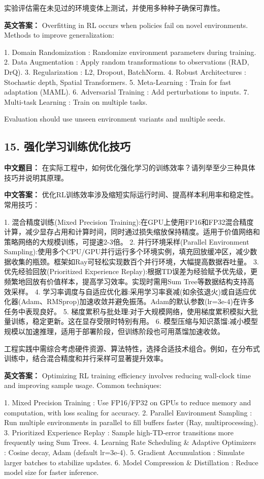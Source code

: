\documentclass[10pt,a4paper]{ctexart}
\begin{document}
实验评估需在未见过的环境变体上测试，并使用多种种子确保可靠性。

\textbf{英文答案：}  
Overfitting in RL occurs when policies fail on novel environments. Methods to improve generalization:

1.  Domain Randomization : Randomize environment parameters during training.
2.  Data Augmentation : Apply random transformations to observations (RAD, DrQ).
3.  Regularization : L2, Dropout, BatchNorm.
4.  Robust Architectures : Stochastic depth, Spatial Transformers.
5.  Meta-Learning : Train for fast adaptation (MAML).
6.  Adversarial Training : Add perturbations to inputs.
7.  Multi-task Learning : Train on multiple tasks.

Evaluation should use unseen environment variants and multiple seeds.

\subsection*{15. 强化学习训练优化技巧}
\textbf{中文题目：} 在实际工程中，如何优化强化学习的训练效率？请列举至少三种具体技巧并说明其原理。

\textbf{中文答案：}  
优化RL训练效率涉及缩短实际运行时间、提高样本利用率和稳定性。常用技巧：

1.  混合精度训练(Mixed Precision Training):在GPU上使用FP16和FP32混合精度计算，减少显存占用和计算时间，同时通过损失缩放保持精度。适用于价值网络和策略网络的大规模训练，可提速2-3倍。
2.  并行环境采样(Parallel Environment Sampling):使用多个CPU/GPU并行运行多个环境实例，填充回放缓冲区，减少数据收集的瓶颈。框架如Ray可轻松实现数百个并行环境，大幅提高数据吞吐量。
3.  优先经验回放(Prioritized Experience Replay):根据TD误差为经验赋予优先级，更频繁地回放有价值样本，提高学习效率。实现时需用Sum Tree等数据结构支持高效采样。
4.  学习率调度与自适应优化器:采用学习率衰减(如余弦退火)或自适应优化器(Adam、RMSprop)加速收敛并避免振荡。Adam的默认参数(lr=3e-4)在许多任务中表现良好。
5.  梯度累积与批处理:对于大规模网络，使用梯度累积模拟大批量训练，稳定更新。这在显存受限时特别有用。
6.  模型压缩与知识蒸馏:减小模型规模以加速推理，适用于部署阶段，但训练阶段也可用蒸馏加速收敛。

工程实践中需综合考虑硬件资源、算法特性，选择合适技术组合。例如，在分布式训练中，结合混合精度和并行采样可显著提升效率。

\textbf{英文答案：}  
Optimizing RL training efficiency involves reducing wall-clock time and improving sample usage. Common techniques:

1.  Mixed Precision Training : Use FP16/FP32 on GPUs to reduce memory and computation, with loss scaling for accuracy.
2.  Parallel Environment Sampling : Run multiple environments in parallel to fill buffers faster (Ray, multiprocessing).
3.  Prioritized Experience Replay : Sample high-TD-error transitions more frequently using Sum Trees.
4.  Learning Rate Scheduling & Adaptive Optimizers : Cosine decay, Adam (default lr=3e-4).
5.  Gradient Accumulation : Simulate larger batches to stabilize updates.
6.  Model Compression & Distillation : Reduce model size for faster inference.
\end{document}

